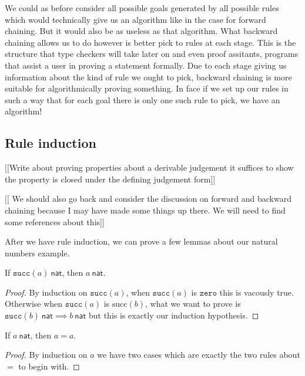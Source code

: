 \begin{remark}
    We could as before consider all possible goals generated by all possible rules which would technically give us an algorithm like in the case for forward chaining. But it would also be as useless as that algorithm. What backward chaining allows us to do however is better pick to rules at each stage. This is the structure that type checkers will take later on and even proof assitants, programs that assist a user in proving a statement formally. Due to each stage giving us information about the kind of rule we ought to pick, backward chaining is more suitable for algorithmically proving something. In face if we set up our rules in such a way that for each goal there is only one such rule to pick, we have an algorithm!
\end{remark}

\subsection{Rule induction}

[[Write about proving properties about a derivable judgement it suffices to show the property is closed under the defining judgement form]]

[[ We should also go back and consider the discussion on forward and backward chaining because I may have made some things up there. We will need to find some references about this]]

After we have rule induction, we can prove a few lemmas about our natural numbers example.


\begin{lemma}
    If $\texttt{succ}(a)\ \mathsf{nat}$, then $a\ \mathsf{nat}$.
\end{lemma}

\begin{proof}
    By induction on $\texttt{succ}(a)$, when $\texttt{succ}(a)$ is $\texttt{zero}$ this is vacously true. Otherwise when $\texttt{succ}(a)$ is $\text{succ}(b)$, what we want to prove is $\texttt{succ}(b)\ \mathsf{nat} \implies b\ \mathsf{nat}$ but this is exactly our induction hypothesis.
\end{proof}


\begin{lemma}[Reflexivity of $=$]
    If $a\ \mathsf{nat}$, then $a = a$.
\end{lemma}

\begin{proof}
    By induction on $a$ we have two cases which are exactly the two rules about $=$ to begin with.
\end{proof}


